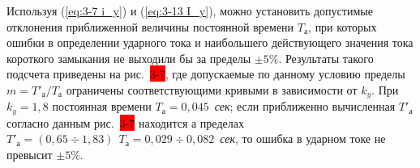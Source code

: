 Используя (\ref{eq:3-7 i_y}) и (\ref{eq:3-13 I_y}), можно установить допустимые отклонения приближенной величины постоянной времени $ T_{\text{а}} $, при которых ошибки в определении ударного тока и наибольшего действующего значения тока короткого замыкания не выходили бы за пределы $ \pm5 \% $. Результаты такого подсчета приведены на рис.~\colorbox{red}{3-7}, где допускаемые по данному условию пределы $ m = T'_{\text{а}} / T_{\text{а}} $ ограничены соответствующими кривыми в зависимости от $ k_y $. При $ k_y = 1,8 $ постоянная времени $ T_{\text{а}} = 0,045 $~\textit{сек}; если приближенно вычисленная $ T'_{\text{а}} $ согласно данным рис.~\colorbox{red}{3-7} находится а пределах $ T'_{\text{а}} = (0,65 \div 1,83)~~T_{\text{а}} = 0,029 \div 0,082 $~\textit{сек}, то ошибка в ударном токе не превысит $ \pm5 \% $.

















